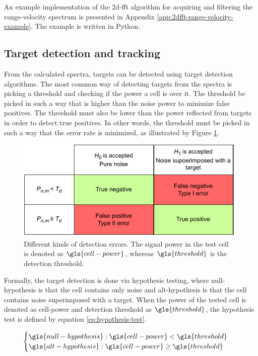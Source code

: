 An example implementation of the \gls{2d-fft} algorithm for acquiring and filtering the range-velocity spectrum
is presented in Appendix \ref{app:2dfft-range-velocity-example}. The example is written in Python.

\subsection{Target detection and tracking}
\label{sec:cfar}
From the calculated spectra, targets can be detected using target detection algorithms.
The most common way of detecting targets from the spectra is picking a threshold and checking if the power a cell is over it.
The threshold be picked in such a way that is higher than the noise power to minimize false positives.
The threshold must also be lower than the power reflected from targets in order to detect true positives. 
In other words, the threshold must be picked in such a way that the error rate is minimized, as illustrated by Figure \ref{fig:error-matrix}.

\begin{figure}
    \centering
    \includegraphics{fig/4/error-matrix.pdf}
    \caption{Different kinds of detection errors. The signal power in the test cell is denoted as $\gls{cell-power}$, whereas $\gls{threshold}$ is the detection threshold.}
    \label{fig:error-matrix}
\end{figure}

Formally, the target detection is done via hypothesis testing, where \gls{null-hypothesis} is that the cell contains only noise
and \gls{alt-hypothesis} is that the cell contains noise superimposed with a target.
When the power of the tested cell is denoted as \gls{cell-power} and detection threshold as $\gls{threshold}$,
the hypothesis test is defined by equation \ref{eq:hypothesis-test}.

\begin{equation}
    \label{eq:hypothesis-test}
    \begin{cases}
        \gls{null-hypothesis}: \gls{cell-power} < \gls{threshold} \\
        \gls{alt-hypothesis}: \gls{cell-power} \ge \gls{threshold}
    \end{cases}
\end{equation}

